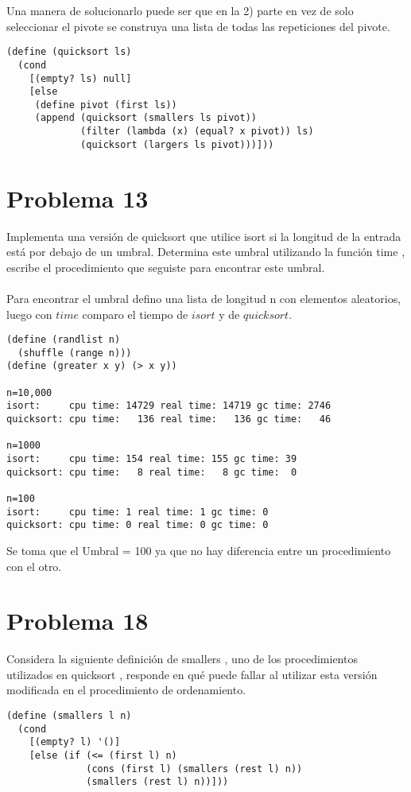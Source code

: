 \documentclass[a4paper,11pt]{article}
\theoremstyle{mytheor}
\begin{document}
Una manera de solucionarlo puede ser que en la 2) parte en vez de solo seleccionar el pivote se construya una lista de todas las repeticiones del pivote.
\begin{lstlisting}[title=quicksort]
(define (quicksort ls)
  (cond
    [(empty? ls) null]
    [else
     (define pivot (first ls))
     (append (quicksort (smallers ls pivot))
             (filter (lambda (x) (equal? x pivot)) ls)
             (quicksort (largers ls pivot)))]))
\end{lstlisting}

\section*{Problema 13}
Implementa una versión de quicksort que utilice isort si la longitud de la entrada está
por debajo de un umbral. Determina este umbral utilizando la función time , escribe el procedimiento
que seguiste para encontrar este umbral. \\ \\

Para encontrar el umbral defino una lista de longitud n con elementos aleatorios, luego con $time$ comparo el tiempo de $isort$ y de $quicksort$.
\begin{lstlisting}[title= timing quicksort and isort]
(define (randlist n)
  (shuffle (range n)))
(define (greater x y) (> x y))

n=10,000
isort:     cpu time: 14729 real time: 14719 gc time: 2746
quicksort: cpu time:   136 real time:   136 gc time:   46

n=1000
isort:     cpu time: 154 real time: 155 gc time: 39
quicksort: cpu time:   8 real time:   8 gc time:  0

n=100
isort:     cpu time: 1 real time: 1 gc time: 0
quicksort: cpu time: 0 real time: 0 gc time: 0

\end{lstlisting}
Se toma que el Umbral = 100 ya que no hay diferencia entre un procedimiento con el otro.

\section*{Problema 18}
Considera la siguiente definición de smallers , uno de los procedimientos utilizados
en quicksort , responde en qué puede fallar al utilizar esta versión modificada en el procedimiento
de ordenamiento.

\begin{lstlisting}[title = smallers]
(define (smallers l n)
  (cond
    [(empty? l) '()]
    [else (if (<= (first l) n)
              (cons (first l) (smallers (rest l) n))
              (smallers (rest l) n))]))
\end{lstlisting}
\end{document}
